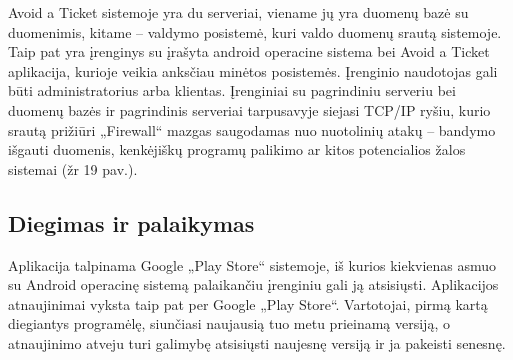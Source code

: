 \documentclass{VUMIFPSkursinis}
\begin{document}
Avoid a Ticket sistemoje yra du serveriai, viename jų yra duomenų bazė su duomenimis, kitame – valdymo posistemė, kuri valdo duomenų srautą sistemoje. Taip pat yra
įrenginys su įrašyta android operacine sistema bei Avoid a Ticket aplikacija, kurioje veikia anksčiau minėtos posistemės. Įrenginio naudotojas gali būti administratorius arba klientas. Įrenginiai su pagrindiniu serveriu bei duomenų bazės ir pagrindinis serveriai tarpusavyje siejasi TCP/IP ryšiu, kurio srautą prižiūri „Firewall“ mazgas saugodamas nuo nuotolinių atakų – bandymo išgauti duomenis, kenkėjiškų programų palikimo ar kitos potencialios žalos sistemai (žr 19 pav.).

\subsection{Diegimas ir palaikymas}

Aplikacija talpinama Google „Play Store“ sistemoje, iš kurios kiekvienas asmuo su Android operacinę sistemą palaikančiu įrenginiu gali ją atsisiųsti. Aplikacijos atnaujinimai vyksta taip pat per Google „Play Store“. Vartotojai, pirmą kartą diegiantys programėlę, siunčiasi naujausią tuo metu prieinamą versiją, o atnaujinimo atveju turi galimybę atsisiųsti naujesnę
versiją ir ja pakeisti senesnę.
\end{document}
